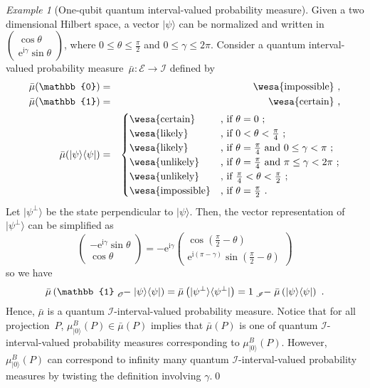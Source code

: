 \documentclass{article}
\theoremstyle{remark}
\newtheorem{example}{Example}
\newcommand{\events}{\ensuremath{\mathcal{E}}}
\newcommand{\ket}[1]{|#1\rangle}
\newcommand{\proj}[1]{|#1 \rangle\langle #1 |}
\newcommand{\imposs}{{\mbox{\wesa{impossible}}}}
\newcommand{\likely}{{\mbox{\wesa{likely}}}}
\newcommand{\unlikely}{{\mbox{\wesa{unlikely}}}}
\newcommand{\necess}{{\mbox{\wesa{certain}}}}
\newcommand{\rme}{\mathrm{e}}
\newcommand{\rmi}{\mathrm{i}}
\begin{document}
\begin{example}[One-qubit quantum interval-valued probability measure]
Given a two dimensional Hilbert space, a vector $\ket{\psi}$ can
be normalized and written in $\left(\begin{array}{c}
\cos\theta\\
\rme^{\rmi\gamma}\sin\theta
\end{array}\right)$, where $0\le\theta\le\frac{\pi}{2}$ and $0\le\gamma\le2\pi$. Consider
a quantum interval-valued probability measure~$\bar{\mu}:\events\rightarrow\mathscr{I}$
defined by 
\begin{eqnarray*}
\bar{\mu}(\mathbb{0}) & = & \imposs\textrm{ ,}\\
\bar{\mu}(\mathbb{1}) & = & \necess\textrm{ ,}\\
\bar{\mu}(\proj{\psi}) & = & \begin{cases}
\necess & \textrm{, if }\theta=0\textrm{ ;}\\
\likely & \textrm{, if }0<\theta<\frac{\pi}{4}\textrm{ ;}\\
\likely & \textrm{, if }\theta=\frac{\pi}{4}\textrm{ and }0\le\gamma<\pi\textrm{ ;}\\
\unlikely & \textrm{, if }\theta=\frac{\pi}{4}\textrm{ and }\pi\le\gamma<2\pi\textrm{ ;}\\
\unlikely & \textrm{, if }\frac{\pi}{4}<\theta<\frac{\pi}{2}\textrm{ ;}\\
\imposs & \textrm{, if }\theta=\frac{\pi}{2}\textrm{ .}
\end{cases}
\end{eqnarray*}
Let $\ket{\psi^{\perp}}$ be the state perpendicular to $\ket{\psi}$.
Then, the vector representation of $\ket{\psi^{\perp}}$ can be simplified
as 
\[
\left(\begin{array}{c}
-\rme^{\rmi\gamma}\sin\theta\\
\cos\theta
\end{array}\right)=-\rme^{\rmi\gamma}\left(\begin{array}{c}
\cos\left(\frac{\pi}{2}-\theta\right)\\
\rme^{\rmi\left(\pi-\gamma\right)}\sin\left(\frac{\pi}{2}-\theta\right)
\end{array}\right)
\]
so we have
\[
\bar{\mu}\left(\mathbb{1}\tensor*[_{\mathscr{O}}]{-}{}\proj{\psi}\right)=\bar{\mu}\left(\proj{\psi^{\perp}}\right)=1\tensor*[_{\mathscr{I}}]{-}{}\bar{\mu}\left(\proj{\psi}\right)\textrm{ .}
\]
Hence, $\bar{\mu}$ is a quantum $\mathscr{I}$-interval-valued
probability measure. Notice that for all projection~$P$, $\mu^B_{\ket{0}}(P)\in\bar{\mu}(P)$
implies that $\bar{\mu}(P)$ is one of quantum
$\mathscr{I}$-interval-valued probability measures corresponding
to $\mu^B_{\ket{0}}(P)$. However,
$\mu^B_{\ket{0}}(P)$ can correspond
to infinity many quantum $\mathscr{I}$-interval-valued probability
measures by twisting the definition involving $\gamma$.\qed\end{example}
\end{document}
